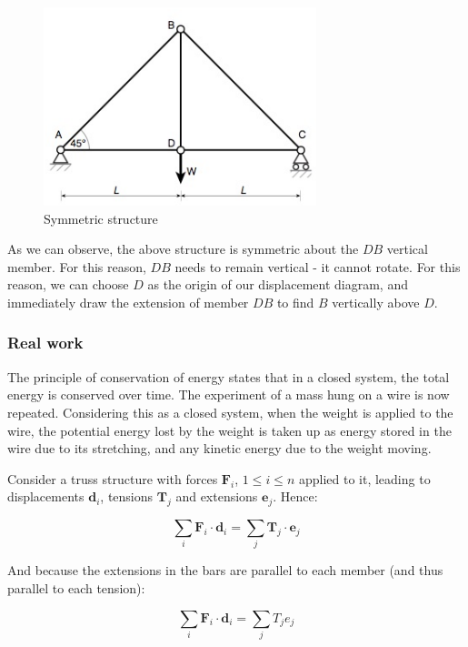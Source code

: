 \documentclass{article}
\begin{document}
\begin{figure}[h]
    \centering
    \includegraphics{images/displacement3.png}
    \caption{Symmetric structure}
    \label{fig:enter-label}
\end{figure}

As we can observe, the above structure is symmetric about the $DB$ vertical member. For this reason, $DB$ needs to remain vertical - it cannot rotate. For this reason, we can choose $D$ as the origin of our displacement diagram, and immediately draw the extension of member $DB$ to find $B$ vertically above $D$.

\subsubsection{Real work}

The principle of conservation of energy states that in a closed system, the total energy is conserved over time. The experiment of a mass hung on a wire is now repeated. Considering this as a closed system, when the weight is applied to the wire, the potential energy lost by the weight is taken up as energy stored in the wire due to its stretching, and any kinetic energy due to the weight moving.

\begin{proposition}
    Consider a truss structure with forces $\mathbf{F}_i$, $1 \leq i \leq n$ applied to it, leading to displacements $\mathbf{d}_i$, tensions $\mathbf{T}_j$ and extensions $\mathbf{e}_j$. Hence:

    \[ \sum_i \mathbf{F}_i \cdot \mathbf{d}_i = \sum_j \mathbf{T}_j \cdot \mathbf{e}_j \]

    And because the extensions in the bars are parallel to each member (and thus parallel to each tension):

    \[ \sum_i \mathbf{F}_i \cdot \mathbf{d}_i = \sum_j T_je_j \]
\end{proposition}
\end{document}
